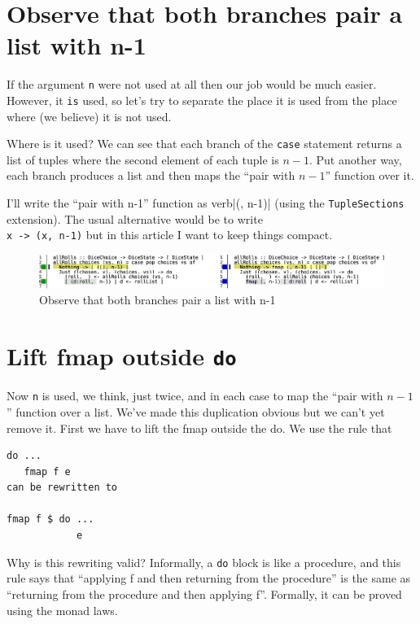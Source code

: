 \section{Observe that both branches pair a list with n-1}


If the argument \texttt{n} were not used at all then our job would be much easier. However, it \texttt{is} used, so let's try to separate the place it is used from the place where (we believe) it is not used.

Where is it used? We can see that each branch of the \texttt{case} statement returns a list of tuples where the second element of each tuple is $n-1$. Put another way, each branch produces a list and then maps the ``pair with $n-1$'' function over it.

I'll write the ``pair with n-1'' function as verb|(, n-1)| (using the \texttt{TupleSections} extension). The usual alternative would be to write \texttt{\\x -> (x, n-1)} but in this article I want to keep things compact.

\begin{figure}[htbp]
 \centering
 \includegraphics[width=\linewidth]{./pics/diff18.pdf}
 \caption{Observe that both branches pair a list with n-1}
 \label{fig:diff18}
\end{figure}


\section{Lift fmap outside \texttt{do}}


Now \texttt{n} is used, we think, just twice, and in each case to map the ``pair with $n-1$'' function over a list. We've made this duplication obvious but we can't yet remove it. First we have to lift the fmap outside the do. We use the rule that

\begin{verbatim}
do ...
   fmap f e
can be rewritten to

fmap f $ do ...
            e
\end{verbatim}
Why is this rewriting valid? Informally, a \texttt{do} block is like a procedure, and this rule says that ``applying f and then returning from the procedure'' is the same as ``returning from the procedure and then applying f''. Formally, it can be proved using the monad laws.


